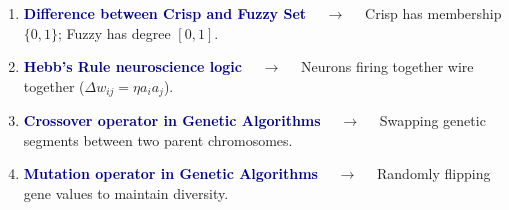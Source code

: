 \documentclass[11pt,a4paper]{article}
\begin{document}
\begin{enumerate}[label=\arabic*., leftmargin=*, labelsep=0.8em, itemsep=0.35em, parsep=0.1em, topsep=0.2em]
  \item \textcolor{darkblue}{\textbf{Difference between Crisp and Fuzzy Set}} $\quad\to\quad$ Crisp has membership $\{0,1\}$; Fuzzy has degree $[0,1]$.
  \item \textcolor{darkblue}{\textbf{Hebb's Rule neuroscience logic}} $\quad\to\quad$ Neurons firing together wire together ($\Delta w_{ij}=\eta a_i a_j$).
  \item \textcolor{darkblue}{\textbf{Crossover operator in Genetic Algorithms}} $\quad\to\quad$ Swapping genetic segments between two parent chromosomes.
  \item \textcolor{darkblue}{\textbf{Mutation operator in Genetic Algorithms}} $\quad\to\quad$ Randomly flipping gene values to maintain diversity.
\end{enumerate}
\end{document}
